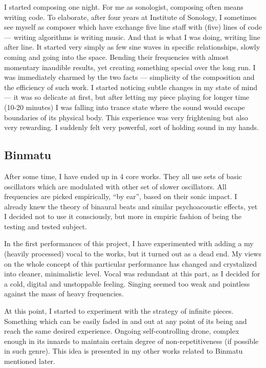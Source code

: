 \documentclass[12pt,a4paper,oneside]{report}
\begin{document}
I started composing one night. For me as sonologist, composing often means writing code. To elaborate, after four years at Institute of Sonology, I sometimes see myself as composer which have exchange five line staff with (five) lines of code --- writing algorithms is writing music. And that is what I was doing, writing line after line. It started very simply as few sine waves in specific relationships, slowly coming and going into the space. Bending their frequencies with almost momentary inaudible results, yet creating something special over the long run. I was immediately charmed by the two facts --- simplicity of the composition and the efficiency of such work. I started noticing subtle changes in my state of mind --- it was so delicate at first, but after letting my piece playing for longer time (10-20 minutes) I was falling into trance state where the sound would escape boundaries of its physical body. This experience was very frightening but also very rewarding. I suddenly felt very powerful, sort of holding sound in my hands. 

\subsection{Binmatu} After some time, I have ended up in 4 core works. They all use sets of basic oscillators which are modulated with other set of slower oscillators. All frequencies are picked empirically, ``by ear'', based on their sonic impact. I already knew the theory of binaural beats and similar psychoacoustic effects, yet I decided not to use it consciously, but more in empiric fashion of being the testing and tested subject.

In the first performances of this project, I have experimented with adding a my (heavily processed) vocal to the works, but it turned out as a dead end. My views on the whole concept of this particular performance has changed and crystalized into cleaner, minimalistic level. Vocal was redundant at this part, as I decided for a cold, digital and unstoppable feeling. Singing seemed too weak and pointless against the mass of heavy frequencies. 

At this point, I started to experiment with the strategy of infinite pieces. Something which can be easily faded in and out at any point of its being and reach the same desired experience. Ongoing self-controlling drone, complex enough in its innards to maintain certain degree of non-repetitiveness (if possible in such genre). This idea is presented in my other works related to Binmatu mentioned later. 
\end{document}

